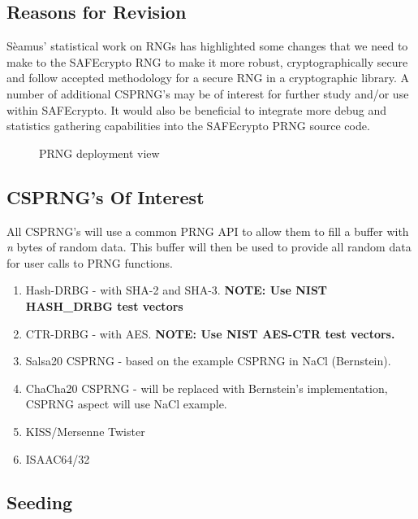 \subsection{Reasons for Revision}

S{\`e}amus' statistical work on RNGs has highlighted some changes that we need to make to the SAFEcrypto RNG to make it more robust, cryptographically secure and follow accepted methodology for a secure RNG in a cryptographic library. A number of additional CSPRNG's may be of interest for further study and/or use within SAFEcrypto. It would also be beneficial to integrate more debug and statistics gathering capabilities into the SAFEcrypto PRNG source code.

\begin{figure}[!h]
\centering
\caption{PRNG deployment view}
\label{fig:prng_proposal}
\end{figure}

\subsection{CSPRNG's Of Interest}

All CSPRNG's will use a common PRNG API to allow them to fill a buffer with \textit{n} bytes of random data. This buffer will then be used to provide all random data for user calls to PRNG functions.

\begin{enumerate}
\item Hash-DRBG - with SHA-2 and SHA-3. \textbf{NOTE: Use NIST HASH\_DRBG test vectors}
\item CTR-DRBG - with AES. \textbf{NOTE: Use NIST AES-CTR test vectors.}
\item Salsa20 CSPRNG - based on the example CSPRNG in NaCl (Bernstein).
\item ChaCha20 CSPRNG - will be replaced with Bernstein's implementation, CSPRNG aspect will use NaCl example.
\item KISS/Mersenne Twister
\item ISAAC64/32
\end{enumerate}

\subsection{Seeding}

